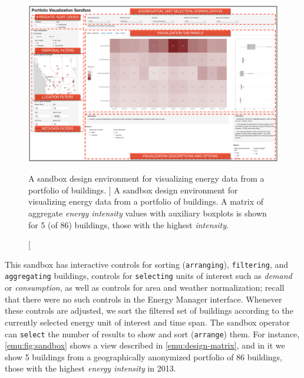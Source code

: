 \begin{figure}
	\centering
	\includegraphics[width=\textwidth]{figures/sandbox.pdf}
	\caption
	[
	    A sandbox design environment for visualizing energy data from a portfolio of buildings.
	]
	{
	    A sandbox design environment for visualizing energy data from a portfolio of buildings. A matrix of aggregate \textsl{energy intensity} values with auxiliary boxplots is shown for 5 (of 86) buildings, those with the highest \textsl{intensity}.
	}
	\centering
	\label{emu:fig:sandbox}
\end{figure} 


\begin{sloppypar}
This sandbox has interactive controls for sorting ({\tt arranging}), {\tt filtering}, and {\tt aggregating} buildings, controls for {\tt selecting} units of interest such as {\it demand} or {\it consumption}, as well as controls for area and weather normalization; recall that there were no such controls in the Energy Manager interface.
Whenever these controls are adjusted, we sort the filtered set of buildings according to the currently selected energy unit of interest and time span.
The sandbox operator can {\tt select} the number of results to show and sort ({\tt arrange}) them. 
For instance, \autoref{emu:fig:sandbox} shows a view described in \autoref{emu:design-matrix}, and in it we show 5 buildings from a geographically anonymized portfolio of 86 buildings, those with the highest {\it energy intensity} in 2013. 
\end{sloppypar}

